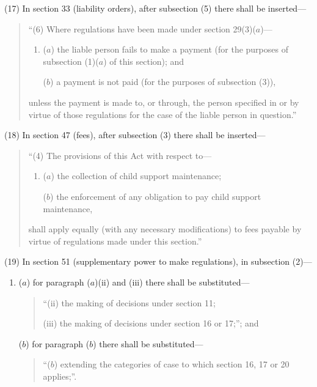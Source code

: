 \documentclass[12pt,a4paper]{article}
\begin{document}
(17) In section 33 (liability orders), after subsection (5)  there shall be inserted—
\begin{quotation}
“(6) Where regulations have been made under section 29(3)($a$)—
\begin{enumerate}\item[]
($a$) the liable person fails to make a payment (for the purposes of subsection (1)($a$)  of this section); and

($b$) a payment is not paid (for the purposes of subsection (3)),
\end{enumerate}
unless the payment is made to, or through, the person specified in or by virtue of those regulations for the case of the liable person in question.”
\end{quotation}

(18) In section 47 (fees), after subsection (3)  there shall be inserted—
\begin{quotation}
“(4) The provisions of this Act with respect to—
\begin{enumerate}\item[]
($a$) the collection of child support maintenance;

($b$) the enforcement of any obligation to pay child support maintenance,
\end{enumerate}
shall apply equally (with any necessary modifications) to fees payable by virtue of regulations made under this section.”
\end{quotation}

(19) In section 51 (supplementary power to make regulations), in subsection (2)—
\begin{enumerate}\item[]
($a$) for paragraph ($a$)(ii)  and (iii)  there shall be substituted—
\begin{quotation}
“(ii) the making of decisions under section 11;

(iii) the making of decisions under section 16 or 17;”; and
\end{quotation}

($b$) for paragraph ($b$)  there shall be substituted—
\begin{quotation}
“($b$) extending the categories of case to which section 16, 17 or 20 applies;”.
\end{quotation}
\end{enumerate}
\end{document}
